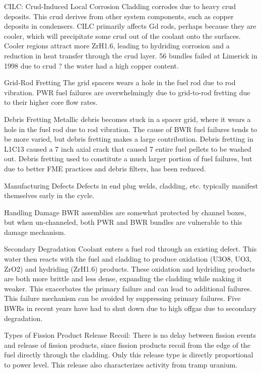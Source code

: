 \documentclass[10pt]{article}
\begin{document}
CILC: Crud-Induced Local Corrosion
Cladding corrodes due to heavy crud deposits. This crud derives from other system components, such as copper deposits in condensers. CILC primarily affects Gd rods, perhaps because they are cooler, which will precipitate some crud out of the coolant onto the surfaces. Cooler regions attract more ZrH1.6, leading to hydriding corrosion and a reduction in heat transfer through the crud layer. 56 bundles failed at Limerick in 1998 due to crud ? the water had a high copper content. 

Grid-Rod Fretting
The grid spacers wears a hole in the fuel rod due to rod vibration. PWR fuel failures are overwhelmingly due to grid-to-rod fretting due to their higher core flow rates. 

Debris Fretting
Metallic debris becomes stuck in a spacer grid, where it wears a hole in the fuel rod due to rod vibration. The cause of BWR fuel failures tends to be more varied, but debris fretting makes a large contribution. Debris fretting in L1C13 caused a 7 inch axial crack that caused 7 entire fuel pellets to be washed out. Debris fretting used to constitute a much larger portion of fuel failures, but due to better FME practices and debris filters, has been reduced.

Manufacturing Defects
Defects in end plug welds, cladding, etc. typically manifest themselves early in the cycle. 

Handling Damage
BWR assemblies are somewhat protected by channel boxes, but when un-channeled, both PWR and BWR bundles are vulnerable to this damage mechanism. 

Secondary Degradation
Coolant enters a fuel rod through an existing defect. This water then reacts with the fuel and cladding to produce oxidation (U3O8, UO3, ZrO2) and hydriding (ZrH1.6) products. These oxidation and hydriding products are both more brittle and less dense, expanding the cladding while making it weaker. This exacerbates the primary failure and can lead to additional failures. This failure mechanism can be avoided by suppressing primary failures. Five BWRs in recent years have had to shut down due to high offgas due to secondary degradation.

Types of Fission Product Release
Recoil: There is no delay between fission events and release of fission products, since fission products recoil from the edge of the fuel directly through the cladding. Only this release type is directly proportional to power level. This release also characterizes activity from tramp uranium. 
\end{document}
